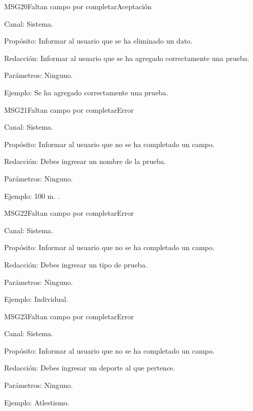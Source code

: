 \begin{mensaje}{MSG20}{Faltan campo por completar}{Aceptación}
	\item[Canal:] Sistema.
	\item[Propósito:] Informar al usuario que se ha eliminado un dato.
	\item[Redacción:] Informar al usuario que se ha agregado correctamente una prueba.
	\item[Parámetros:] Ninguno.
	\item[Ejemplo:] Se ha agregado correctamente una prueba.
\end{mensaje}
\newline



\begin{mensaje}{MSG21}{Faltan campo por completar}{Error}
	\item[Canal:] Sistema.
	\item[Propósito:] Informar al usuario que no se ha completado un campo.
	\item[Redacción:] Debes ingresar un nombre de la prueba.
	\item[Parámetros:] Ninguno.
	\item[Ejemplo:] 100 m. .
\end{mensaje}
\newline



\begin{mensaje}{MSG22}{Faltan campo por completar}{Error}
	\item[Canal:] Sistema.
	\item[Propósito:] Informar al usuario que no se ha completado un campo.
	\item[Redacción:] Debes ingresar un tipo de prueba.
	\item[Parámetros:] Ninguno.
	\item[Ejemplo:] Individual.
\end{mensaje}
\newline



\begin{mensaje}{MSG23}{Faltan campo por completar}{Error}
	\item[Canal:] Sistema.
	\item[Propósito:] Informar al usuario que no se ha completado un campo.
	\item[Redacción:] Debes ingresar un deporte al que pertence.
	\item[Parámetros:] Ninguno.
	\item[Ejemplo:] Atlestismo.
\end{mensaje}
\newline


